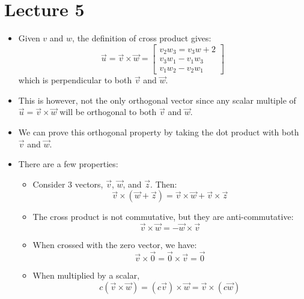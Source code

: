 \section{Lecture 5}
\begin{itemize}
    \item Given $v$ and $w$, the definition of cross product gives:
    \begin{equation}
        \vec{u} = \vec{v}\times \vec{w} = \begin{bmatrix}
            v_2w_3=v_3w+2 \\ v_3w_1 - v_1w_3 \\ v_1w_2 - v_2w_1
        \end{bmatrix}
        \label{eq:}
    \end{equation}
    which is perpendicular to both $\vec{v}$ and $\vec{w}$.
    \item This is however, not the only orthogonal vector since any scalar multiple of $\vec{u}=\vec{v}\times \vec{w}$ will be orthogonal to both $\vec{v}$ and $\vec{w}$.
    \item We can prove this orthogonal property by taking the dot product with both $\vec{v}$ and $\vec{w}$.
    \item There are a few properties:
    \begin{itemize}
        \item Consider $3$ vectors, $\vec{v}$, $\vec{w}$, and $\vec{z}$. Then:
        \begin{equation}
            \vec{v}\times (\vec{w}+\vec{z}) = \vec{v} \times \vec{w} + \vec{v} \times \vec{z}
            \label{eq:}
        \end{equation}
        \item The cross product is not commutative, but they are anti-commutative:
        \begin{equation}
            \vec{v}\times \vec{w} = -\vec{w}\times \vec{v}
            \label{eq:}
        \end{equation}
        \item When crossed with the zero vector, we have:
        \begin{equation}
            \vec{v}\times \vec{0} = \vec{0}\times \vec{v} = \vec{0}
            \label{eq:}
        \end{equation}
        \item When multiplied by a scalar,
        \begin{equation}
            c(\vec{v}\times\vec{w}) = (c\vec{v})\times \vec{w} = \vec{v}\times (c\vec{w})

\end{equation}
\end{itemize}
\end{itemize}
